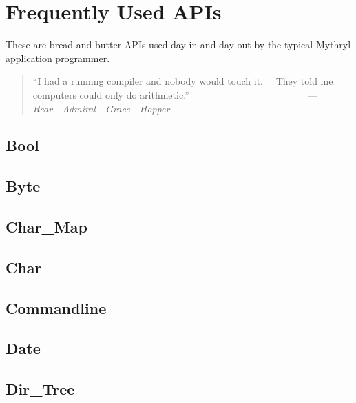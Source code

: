 \section{Frequently Used APIs}

%
%


These are bread-and-butter APIs 
used day in and day out by the typical Mythryl 
application programmer.

\begin{quote}\begin{tiny}
           ``I had a running compiler and nobody would touch it.\newline
            ~~They told me computers could only do arithmetic.''\newline
            ~~~~~~~~~~~~~~~~~~~~~~~~---{\em Rear~~Admiral~~Grace~~Hopper}
\end{tiny}\end{quote}

\subsection{Bool}                                       
\subsection{Byte}					
\subsection{Char\_Map}					
\subsection{Char}					
\subsection{Commandline}				
\subsection{Date}					
\subsection{Dir\_Tree}					
